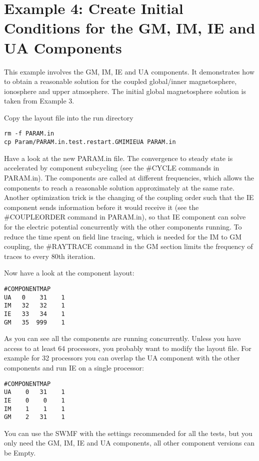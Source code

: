 \section{Example 4: Create Initial Conditions for the GM, IM, IE 
         and UA Components}

This example involves the GM, IM, IE and UA components. It demonstrates
how to obtain a reasonable solution for the 
coupled global/inner magnetosphere, ionosphere and upper atmosphere.
The initial global magnetosphere solution is taken from Example 3.

Copy the layout file into the run directory
\begin{verbatim}
rm -f PARAM.in
cp Param/PARAM.in.test.restart.GMIMIEUA PARAM.in
\end{verbatim}
Have a look at the new PARAM.in file.
The convergence to steady state is accelerated by component subcycling
(see the \#CYCLE commands in PARAM.in).
The components are called at different frequencies, which
allows the components to reach a reasonable solution
approximately at the same rate. Another optimization trick is the changing of 
the coupling order such that the IE component sends information before
it would receive it (see the \#COUPLEORDER command in PARAM.in),
so that IE component can solve for the electric potential concurrently with the
other components running. To reduce the time spent on field line
tracing, which is needed for the IM to GM coupling, the \#RAYTRACE command
in the GM section limits the frequency of traces to every 80th iteration.

Now have a look at the component layout:
\begin{verbatim}
#COMPONENTMAP
UA   0    31    1
IM   32   32    1
IE   33   34    1
GM   35  999    1
\end{verbatim}
As you can see all the components are running concurrently.
Unless you have access to at least 64 processors, 
you probably want to modify the layout file.
For example for 32 processors you can overlap the UA component 
with the other components and run IE on a single processor:
\begin{verbatim}
#COMPONENTMAP
UA    0   31    1
IE    0    0    1
IM    1    1    1
GM    2   31    1
\end{verbatim}
You can use the SWMF with the settings recommended for all the tests, 
but you only need the GM, IM, IE and UA components,
all other component versions can be Empty.

